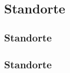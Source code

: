 \documentclass[10pt,a4paper]{beamer}
\begin{document}
    \subsection{Standorte}
    \begin{frame}
        \frametitle{Standorte}
        \begin{center}
        \end{center}
    \end{frame}

    \begin{frame}
        \frametitle{Standorte}
        \begin{center}
        \end{center}
    \end{frame}
\end{document}

